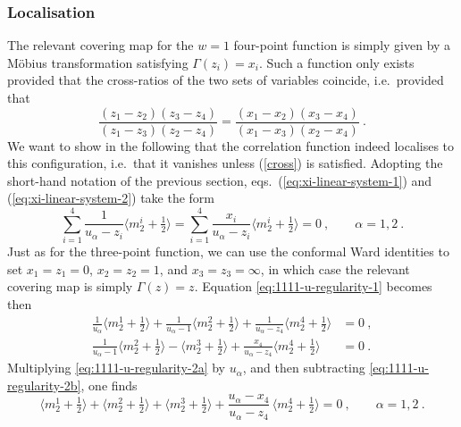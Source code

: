 \documentclass[a4paper,11pt]{article}
\numberwithin{equation}{section}
\def\be{\begin{equation}}
\def\ee{\end{equation}}
\begin{document}
\subsubsection{Localisation}
The relevant covering map for the $w=1$ four-point function is simply given by a M\"obius transformation satisfying $\Gamma(z_i)=x_i$. Such a function only exists provided that the cross-ratios of the two sets of variables coincide, i.e.\ provided that 
\be\label{cross}
\frac{(z_1-z_2) (z_3 - z_4)}{(z_1 - z_3) (z_2 - z_4)} = \frac{(x_1-x_2) (x_3 - x_4)}{(x_1 - x_3) (x_2 - x_4)} \ . 
\ee
We want to show in the following that the correlation function indeed localises to this configuration, i.e.\ that it vanishes unless (\ref{cross}) is satisfied. Adopting the short-hand notation of the previous section, eqs.~(\ref{eq:xi-linear-system-1}) and (\ref{eq:xi-linear-system-2}) take the form 
\begin{equation}
\sum_{i=1}^{4}\frac{1}{u_{\alpha}-z_i}\bigl\langle m_2^i+\tfrac{1}{2} \bigr\rangle
=\sum_{i=1}^{4}\frac{x_i}{u_{\alpha}-z_i}\bigl\langle m_2^i+\tfrac{1}{2} \bigr\rangle=0\ ,\qquad \alpha=1,2\ .
\label{eq:1111-u-regularity-1}
\end{equation}
\noindent Just as for the three-point function, we can use the conformal Ward identities to set 
$x_1=z_1=0$, $x_2=z_2=1$, and $x_3=z_3=\infty$, in which case the relevant covering map is simply $\Gamma(z)=z$. Equation \eqref{eq:1111-u-regularity-1} becomes then
\begin{subequations}
\begin{align}
\frac{1}{u_{\alpha}} \bigl\langle m_2^1+\tfrac{1}{2} \bigr\rangle+\frac{1}{u_{\alpha}-1} \bigl\langle m_2^2+\tfrac{1}{2} \bigr\rangle +\frac{1}{u_{\alpha}-z_4}  \bigl\langle m_2^4+\tfrac{1}{2} 
\bigr\rangle &=0\ , \label{eq:1111-u-regularity-2a}
\\
\frac{1}{u_{\alpha} -1} \bigl\langle m_2^2+\tfrac{1}{2} \bigr\rangle -\bigl\langle m_2^3+\tfrac{1}{2} \bigr\rangle +\frac{x_4}{u_{\alpha}-z_4}  \bigl\langle m_2^4+\tfrac{1}{2} 
\bigr\rangle &=0 \ . \label{eq:1111-u-regularity-2b}
\end{align}
\label{eq:1111-u-regularity-2}
\end{subequations}
Multiplying \eqref{eq:1111-u-regularity-2a} by $u_{\alpha}$, and then subtracting \eqref{eq:1111-u-regularity-2b}, one finds
\begin{equation}
\bigl\langle m_2^1+\tfrac{1}{2} \bigr\rangle+\bigl\langle m_2^2+\tfrac{1}{2} \bigr\rangle +\bigl\langle m_2^3+\tfrac{1}{2} \bigr\rangle +\frac{u_{\alpha}-x_4}{u_{\alpha}-z_4}\, \bigl\langle m_2^4+\tfrac{1}{2} \bigr\rangle =0 \ ,\qquad\alpha=1,2\ .
\end{equation}
\end{document}
